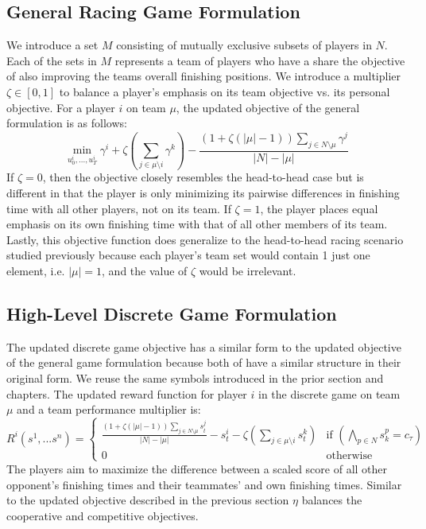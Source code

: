 \subsection{General Racing Game Formulation}
We introduce a set $M$ consisting of mutually exclusive subsets of players in $N$. Each of the sets in $M$ represents a team of players who have a share the objective of also improving the teams overall finishing positions. We introduce a multiplier $\zeta \in [0,1]$ to balance a player's emphasis on its team objective vs. its personal objective. For a player $i$ on team $\mu$, the updated objective of the general formulation is as follows:
\begin{equation} \label{eq:gen_team_obj}
    \min_{u^i_0, ..., u^i_T} \gamma^i+\zeta (\sum_{j \in \mu \setminus i} \gamma^k) - \frac{(1+\zeta(|\mu|-1))\sum_{j \in N \setminus \mu }\gamma^j}{|N|-|\mu|} 
\end{equation}
If $\zeta=0$, then the objective closely resembles the head-to-head case but is different in that the player is only minimizing its pairwise differences in finishing time with all other players, not on its team. If $\zeta=1$, the player places equal emphasis on its own finishing time with that of all other members of its team. Lastly, this objective function does generalize to the head-to-head racing scenario studied previously because each player's team set would contain 1 just one element, i.e. $|\mu|=1$, and the value of $\zeta$ would be irrelevant. 

\subsection{High-Level Discrete Game Formulation}
The updated discrete game objective has a similar form to the updated objective of the general game formulation because both of have a similar structure in their original form. We reuse the same symbols introduced in the prior section and chapters. The updated reward function for player $i$ in the discrete game on team $\mu$ and a team performance multiplier is:
\begin{equation}
    R^i(s^1, ... s^n) = \begin{cases} 
                \frac{(1+\zeta(|\mu|-1))\sum_{j \in N \setminus \mu} s^j_t}{|N|-|\mu|} - s^i_t - \zeta(\sum_{j \in \mu \setminus i} s^k_t) & \text{if } (\bigwedge_{p \in N} s^p_k   = c_\tau) \\ 
                0    & \text{otherwise}
                \end{cases}
\end{equation}
 The players aim to maximize the difference between a scaled score of all other opponent's finishing times and their teammates' and own finishing times. Similar to the updated objective described in the previous section $\eta$ balances the cooperative and competitive objectives.
